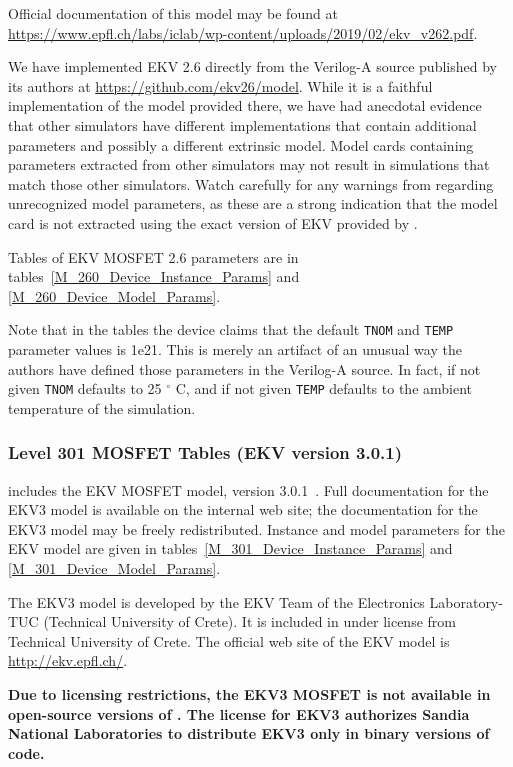 Official documentation of this model may be found at \url{https://www.epfl.ch/labs/iclab/wp-content/uploads/2019/02/ekv_v262.pdf}.

We have implemented EKV 2.6 directly from the Verilog-A source
published by its authors at \url{https://github.com/ekv26/model}.
While it is a faithful implementation of the model provided there, we
have had anecdotal evidence that other simulators have different
implementations that contain additional parameters and possibly a
different extrinsic model.  Model cards containing parameters
extracted from other simulators may not result in \Xyce{} simulations
that match those other simulators.  Watch carefully for any warnings
from \Xyce{} regarding unrecognized model parameters, as these are a
strong indication that the model card is not extracted using the exact
version of EKV provided by \Xyce{}.

Tables of EKV MOSFET 2.6 parameters are in
tables~\ref{M_260_Device_Instance_Params} and
\ref{M_260_Device_Model_Params}.

Note that in the tables the device claims that the default
\texttt{TNOM} and \texttt{TEMP} parameter values is 1e21.  This is
merely an artifact of an unusual way the authors have defined those
parameters in the Verilog-A source.  In fact, if not given
\texttt{TNOM} defaults to 25 $^\circ$ C, and if not given \texttt{TEMP}
defaults to the ambient temperature of the simulation.




\clearpage
\subsubsection{Level 301 MOSFET Tables (EKV version 3.0.1)}
\Xyce{} includes the EKV MOSFET model, version
3.0.1~\cite{BLETK:1997}\cite{EKV:2006}\cite{EKV:2007}.  Full
documentation for the EKV3 model is available on the \Xyce{} internal web site;
the documentation for the EKV3 model may be freely redistributed.  Instance and
model parameters for the EKV model are given in
tables~\ref{M_301_Device_Instance_Params} and \ref{M_301_Device_Model_Params}.

The EKV3 model is developed by the EKV Team of the Electronics Laboratory-TUC
(Technical University of Crete). It is included in \Xyce{} under license from
Technical University of Crete.  The official web site of the EKV model is
\url{http://ekv.epfl.ch/}.

\textbf{Due to licensing restrictions, the EKV3 MOSFET is not available in
     open-source versions of \Xyce{}.  The license for EKV3 authorizes Sandia
     National Laboratories to distribute EKV3 only in binary versions of code.}



